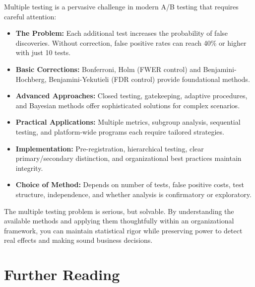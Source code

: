 Multiple testing is a pervasive challenge in modern A/B testing that requires careful attention:

\begin{itemize}
    \item \textbf{The Problem:} Each additional test increases the probability of false discoveries. Without correction, false positive rates can reach 40\% or higher with just 10 tests.

    \item \textbf{Basic Corrections:} Bonferroni, Holm (FWER control) and Benjamini-Hochberg, Benjamini-Yekutieli (FDR control) provide foundational methods.

    \item \textbf{Advanced Approaches:} Closed testing, gatekeeping, adaptive procedures, and Bayesian methods offer sophisticated solutions for complex scenarios.

    \item \textbf{Practical Applications:} Multiple metrics, subgroup analysis, sequential testing, and platform-wide programs each require tailored strategies.

    \item \textbf{Implementation:} Pre-registration, hierarchical testing, clear primary/secondary distinction, and organizational best practices maintain integrity.

    \item \textbf{Choice of Method:} Depends on number of tests, false positive costs, test structure, independence, and whether analysis is confirmatory or exploratory.
\end{itemize}

The multiple testing problem is serious, but solvable. By understanding the available methods and applying them thoughtfully within an organizational framework, you can maintain statistical rigor while preserving power to detect real effects and making sound business decisions.

\section{Further Reading}

